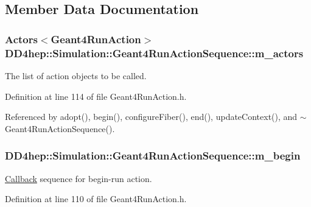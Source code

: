 \subsection{Member Data Documentation}
\hypertarget{class_d_d4hep_1_1_simulation_1_1_geant4_run_action_sequence_a780b499622542d52941141b108ab1258}{
\subsubsection[{m\_\-actors}]{\setlength{\rightskip}{0pt plus 5cm}Actors$<${\bf Geant4RunAction}$>$ {\bf DD4hep::Simulation::Geant4RunActionSequence::m\_\-actors}}}
\label{class_d_d4hep_1_1_simulation_1_1_geant4_run_action_sequence_a780b499622542d52941141b108ab1258}


The list of action objects to be called. 

Definition at line 114 of file Geant4RunAction.h.

Referenced by adopt(), begin(), configureFiber(), end(), updateContext(), and $\sim$Geant4RunActionSequence().\hypertarget{class_d_d4hep_1_1_simulation_1_1_geant4_run_action_sequence_a833ebd7f7da62ebeeb561815387b0bbe}{
\subsubsection[{m\_\-begin}]{ {\bf DD4hep::Simulation::Geant4RunActionSequence::m\_\-begin}}}
\label{class_d_d4hep_1_1_simulation_1_1_geant4_run_action_sequence_a833ebd7f7da62ebeeb561815387b0bbe}


\hyperlink{class_d_d4hep_1_1_callback}{Callback} sequence for begin-\/run action. 

Definition at line 110 of file Geant4RunAction.h.

